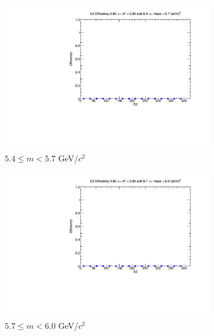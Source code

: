 \begin{figure}[p]
\begin{subfigure}[b]{0.32\textwidth}
        \includegraphics[width=\textwidth]{./kTrackerEfficiencyPlots/D2_Efficiency_xF16_mass4.pdf}
        \caption{$5.4 \leq m < 5.7$ GeV/$c^2$}
        \label{fig:xF16_mass4}
    \end{subfigure}
    \hfill
    \begin{subfigure}[b]{0.32\textwidth}
        \centering
        \includegraphics[width=\textwidth]{./kTrackerEfficiencyPlots/D2_Efficiency_xF16_mass5.pdf}
        \caption{$5.7 \leq m < 6.0$ GeV/$c^2$}
        \label{fig:xF16_mass5}
    \end{subfigure}
    \vspace{0.5cm}
    \begin{subfigure}[b]{0.32\textwidth}
        \centering

\end{subfigure}
\end{figure}
